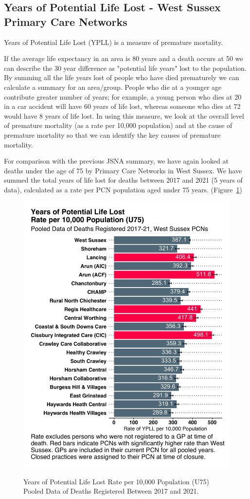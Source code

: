 \subsection{Years of Potential Life Lost - West Sussex Primary Care Networks}
Years of Potential Life Lost (YPLL) is a measure of premature mortality.

If the average life expectancy in an area is 80 years and a death occurs at 50 we can describe the 30 year difference as "potential life years" lost to the population. By summing all the life years lost of people who have died prematurely we can calculate a summary for an area/group. People who die at a younger age contribute greater number of years; for example, a young person who dies at 20 in a car accident will have 60 years of life lost, whereas someone who dies at 72 would have 8 years of life lost. In using this measure, we look at the overall level of premature mortality (as a rate per 10,000 population) and at the cause of premature mortality so that we can identify the key causes of premature mortality.

For comparison with the previous JSNA summary, we  have again looked at deaths under the age of 75 by Primary Care Networks in West Sussex. We have summed the total years of life lost for deaths between 2017 and 2021 (5 years of data), calculated as a rate per PCN population aged under 75 years. (Figure~\ref{fig:ypll})

\begin{figure}[htp]
    \caption{Years of Potential Life Lost Rate per 10,000 Population (U75) Pooled Data of Deaths Registered Between 2017 and 2021.}
    \centering
	\includegraphics[width=\linewidth]{images/ypll_by_pcn.png}
	\label{fig:ypll}
\end{figure}

